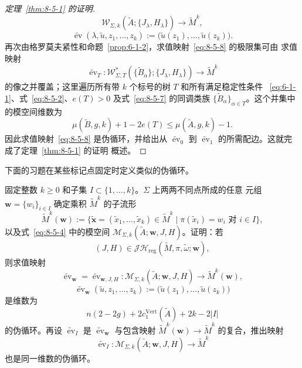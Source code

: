 \begin{proof}[定理~\ref{thm:8-5-1} 的证明]
\begin{equation}
  \mathcal W_{\Sigma,k}
  (\widetilde A;\{J_\lambda,H_\lambda\})
  \longrightarrow\widetilde M^k,
\end{equation}
\[
  \widetilde{\operatorname{ev}}
  (\lambda,\widetilde u,z_1,\ldots,z_k)
  :=\bigl(\widetilde u(z_1),\ldots,\widetilde u(z_k)\bigr).
\]
再次由格罗莫夫紧性和命题~\ref{prop:6-1-2}，求值映射~\eqref{eq:8-5-8} 的极限集可由
求值映射
\[
  \widetilde{\operatorname{ev}}_T:
  \mathcal W^*_{\Sigma,T}
  (\{\widetilde B_\alpha\};\{J_\lambda,H_\lambda\})
  \longrightarrow\widetilde M^k
\]
的像之并覆盖；这里遍历所有带 $k$ 个标号的树 $T$ 和所有满足稳定性条件
~\eqref{eq:6-1-1}、式~\eqref{eq:8-5-2}、$e(T)>0$ 及式~\eqref{eq:8-5-7} 的同调类族
$\{\widetilde B_\alpha\}_{\alpha\in T}$。这个并集中的模空间维数为
\[
  \mu(\widetilde B,g,k)+1-2e(T)
  \le\mu(\widetilde A,g,k)-1.
\]
因此求值映射~\eqref{eq:8-5-8} 是伪循环，并给出从
$\widetilde{\operatorname{ev}}_0$ 到
$\widetilde{\operatorname{ev}}_1$ 的所需配边。这就完成了定理~\ref{thm:8-5-1} 的证明
概述。
\end{proof}

下面的习题在某些标记点固定时定义类似的伪循环。

\begin{exercise}\label{ex:8-5-4}
固定整数 $k\ge0$ 和子集 $I\subset\{1,\ldots,k\}$。$\Sigma$ 上两两不同点所成的任意
元组 $\mathbf w=\{w_i\}_{i\in I}$ 确定乘积 $\widetilde M^k$ 的子流形
\[
  \widetilde M^k(\mathbf w)
  :=\bigl\{\widetilde{\mathbf x}
  =(\widetilde x_1,\ldots,\widetilde x_k)\in\widetilde M^k\mid
  \pi(\widetilde x_i)=w_i\text{ 对 }i\in I\bigr\},
\]
以及式~\eqref{eq:8-5-4} 中的模空间
$\mathcal M_{\Sigma,k}(\widetilde A;\mathbf w,J,H)$。证明：若
\[
  (J,H)\in\mathcal J\mathcal H_{\mathrm{reg}}
  (\widetilde M,\pi,\widetilde\omega;\mathbf w),
\]
则求值映射
\begin{equation}\label{eq:8-5-9}
  \widetilde{\operatorname{ev}}_{\mathbf w}
  =\widetilde{\operatorname{ev}}_{\mathbf w,J,H}:
  \mathcal M_{\Sigma,k}(\widetilde A;\mathbf w,J,H)
  \longrightarrow\widetilde M^k(\mathbf w),
\end{equation}
\[
  \widetilde{\operatorname{ev}}_{\mathbf w}
  (\widetilde u,z_1,\ldots,z_k)
  :=\bigl(\widetilde u(z_1),\ldots,\widetilde u(z_k)\bigr)
\]
是维数为
\[
  n(2-2g)+2c_1^{\mathrm{Vert}}(\widetilde A)+2k-2|I|
\]
的伪循环。再设 $\widetilde{\operatorname{ev}}_I$ 是
$\widetilde{\operatorname{ev}}_{\mathbf w}$ 与包含映射
$\widetilde M^k(\mathbf w)\to\widetilde M^k$ 的复合，推出映射
\begin{equation}\label{eq:8-5-10}
  \widetilde{\operatorname{ev}}_I:
  \mathcal M_{\Sigma,k}(\widetilde A;\mathbf w,J,H)
  \longrightarrow\widetilde M^k
\end{equation}
也是同一维数的伪循环。
\end{exercise}
